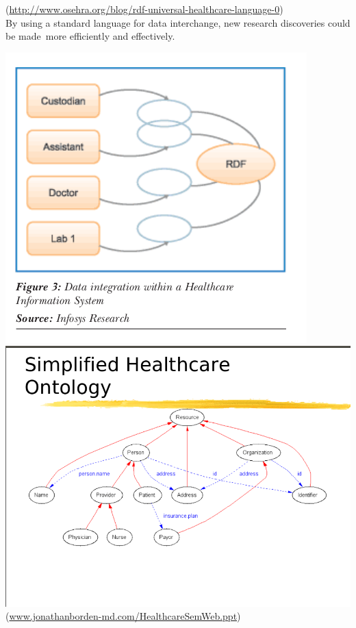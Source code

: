 \documentclass[DIV=calc, paper=a4, fontsize=12pt, onecolumn]{scrartcl}	 %
\begin{document}
 (\url{http://www.osehra.org/blog/rdf-universal-healthcare-language-0})\\

By using a standard language for data interchange, new research discoveries could be made\
more efficiently and effectively.\

\includegraphics[scale=0.65]{rdfh.png}
 \cite{parachuri2008role}\\

\includegraphics[scale=0.4]{rdf1.png}\\
 (\url{www.jonathanborden-md.com/HealthcareSemWeb.ppt‎})\\
\end{document}
